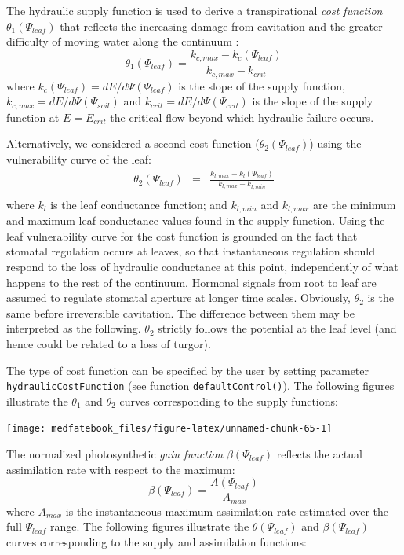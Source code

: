 \documentclass[]{book}
\begin{document}
The hydraulic supply function is used to derive a transpirational \emph{cost function} \(\theta_1(\Psi_{leaf})\) that reflects the increasing damage from cavitation and the greater difficulty of moving water along the continuum \citep{Sperry2016a}:
\begin{equation}
\theta_1(\Psi_{leaf}) = \frac{k_{c,max}-k_{c}(\Psi_{leaf})}{k_{c,max}-k_{crit}}
\end{equation}
where \(k_c(\Psi_{leaf}) = dE/d\Psi(\Psi_{leaf})\) is the slope of the supply function, \(k_{c,max} = dE/d\Psi(\Psi_{soil})\) and \(k_{crit} = dE/d\Psi(\Psi_{crit})\) is the slope of the supply function at \(E = E_{crit}\) the critical flow beyond which hydraulic failure occurs.

Alternatively, we considered a second cost function (\(\theta_2(\Psi_{leaf})\)) using the vulnerability curve of the leaf:
\begin{eqnarray}
\theta_2(\Psi_{leaf}) &=& \frac{k_{l, max}-k_l(\Psi_{leaf})}{k_{l,max} - k_{l,min}}\\
\end{eqnarray}
where \(k_l\) is the leaf conductance function; and \(k_{l,min}\) and \(k_{l,max}\) are the minimum and maximum leaf conductance values found in the supply function. Using the leaf vulnerability curve for the cost function is grounded on the fact that stomatal regulation occurs at leaves, so that instantaneous regulation should respond to the loss of hydraulic conductance at this point, independently of what happens to the rest of the continuum. Hormonal signals from root to leaf are assumed to regulate stomatal aperture at longer time scales. Obviously, \(\theta_2\) is the same before irreversible cavitation. The difference between them may be interpreted as the following. \(\theta_2\) strictly follows the potential at the leaf level (and hence could be related to a loss of turgor).

The type of cost function can be specified by the user by setting parameter \texttt{hydraulicCostFunction} (see function \texttt{defaultControl()}). The following figures illustrate the \(\theta_1\) and \(\theta_2\) curves corresponding to the supply functions:

\begin{center}\texttt{[image: medfatebook\_files/figure-latex/unnamed-chunk-65-1]} \end{center}

The normalized photosynthetic \emph{gain function} \(\beta(\Psi_{leaf})\) reflects the actual assimilation rate with respect to the maximum:
\begin{equation}
\beta(\Psi_{leaf}) = \frac{A(\Psi_{leaf})}{A_{max}}
\end{equation}
where \(A_{max}\) is the instantaneous maximum assimilation rate estimated over the full \(\Psi_{leaf}\) range. The following figures illustrate the \(\theta(\Psi_{leaf})\) and \(\beta(\Psi_{leaf})\) curves corresponding to the supply and assimilation functions:
\end{document}
